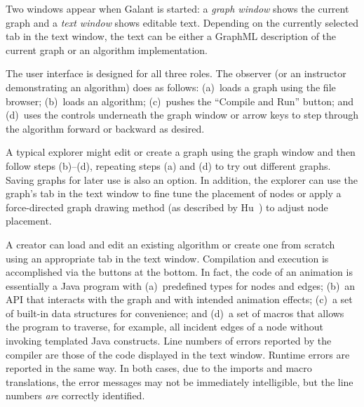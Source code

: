 Two windows appear when Galant is started: a \emph{graph window} shows the
current graph and a \emph{text window} shows editable text.
Depending on the currently selected tab in the text window,
the text can be either a GraphML description of the current graph or an
algorithm implementation. 

The user interface is designed for all three roles.
The observer (or an instructor demonstrating an algorithm) does as follows: (a)~loads a graph using the file browser; (b)~loads an algorithm; (c)~pushes the ``Compile and Run'' button; and (d)~uses
the controls underneath the graph window or arrow keys to step through the algorithm
forward or backward as desired.

A typical explorer might edit or create a graph using the graph window and then
follow steps (b)--(d), repeating steps (a) and (d) to try out different
graphs. Saving graphs for later use is also an option.
In addition, the explorer can use the graph's tab
in the text window to fine tune the placement of
nodes or apply a force-directed graph drawing method
(as described by Hu~\cite{2006-Mathematica-Hu}) to adjust node placement.

A creator can load and edit an existing algorithm or create one from scratch
using an appropriate tab in the text window.
Compilation and execution is accomplished via the buttons at the bottom.
In fact, the code of an animation is essentially a Java program with
(a)~predefined types for nodes and edges; (b)~an
API that interacts with the graph and with intended animation effects; (c)~a
set of built-in data structures for convenience; and (d)~a set of macros that
allows the program to traverse, for example, all incident edges of a node
without invoking templated Java constructs.
Line numbers of errors reported by the compiler are those of the code
displayed in the text window.
Runtime errors are reported in the same way.
In both cases, due to the imports and macro translations, the error messages
may not be immediately intelligible, but the line numbers \emph{are}
correctly identified.

